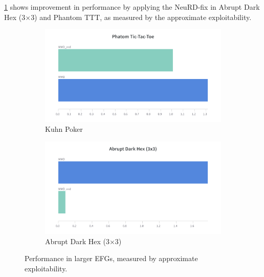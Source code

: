 
\ref{fig:neural2} shows improvement in performance by applying the NeuRD-fix in Abrupt Dark Hex
(3$\times$3) and Phantom TTT, as measured by the approximate exploitability.
\begin{figure}[H]
	\centering
	\begin{subfigure}[b]{0.4\textwidth}
		\includegraphics[width=\textwidth]{figs/pttt.png}
		\caption{Kuhn Poker}
	\end{subfigure}
	\begin{subfigure}[b]{0.4\textwidth}
		\includegraphics[width=\textwidth]{figs/ahex33.png}
		\caption{Abrupt Dark Hex (3$\times$3)}
	\end{subfigure}
	\caption{Performance in larger EFGs, measured by approximate exploitability.}
	\label{fig:neural2}
\end{figure}

